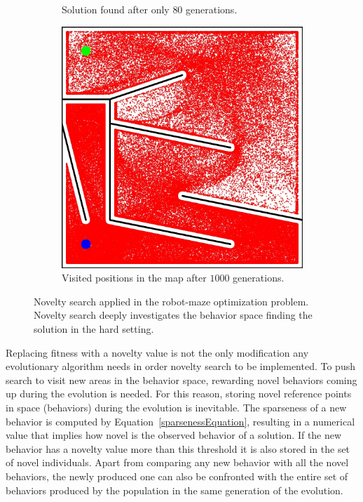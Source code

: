 \begin{figure}[t!]
\begin{subfigure}[b]{0.3\textwidth}
\caption{Solution found after only $80$ generations.}
\label{fig:mazeNoveltyHardSolution}
\end{subfigure}\hspace{0.3cm}
\begin{subfigure}[b]{0.3\textwidth}
\includegraphics[width=1.0\textwidth]{../Figures/Misc/MazeHardNovelty.jpg}
\caption{ Visited positions in the map after $1000$ generations.}
\label{fig:mazeNoveltyHard}
\end{subfigure}
\caption{Novelty search applied in the robot-maze optimization problem. Novelty search deeply investigates the behavior space finding the solution in the hard setting.}
\label{fig:mazeNovelty}
\end{figure}


Replacing fitness with a novelty value is not the only modification any evolutionary algorithm needs in order novelty search to be implemented. To push search to visit new areas in the behavior space, rewarding novel behaviors coming up during the evolution is needed. For this reason, storing novel reference points in space (behaviors) during the evolution is inevitable. The sparseness of a new behavior is computed by Equation~\ref{sparsenessEquation}, resulting in a numerical value that implies how novel is the observed behavior of a solution. If the new behavior has a novelty value more than this threshold it is also stored in the set of novel individuals. Apart from comparing any new behavior with all the novel behaviors, the newly produced one can also be confronted with the entire set of behaviors produced by the population in the same generation of the evolution. 

